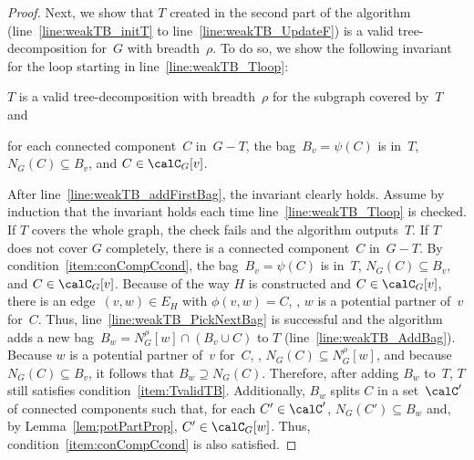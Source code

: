 \begin{proof}
Next, we show that $T$ created in the second part of the algorithm (line~\ref{line:weakTB_initT} to line~\ref{line:weakTB_UpdateF}) is a valid tree-decomposition for~$G$ with breadth~$\rho$.
To do so, we show the following invariant for the loop starting in line~\ref{line:weakTB_Tloop}:
\begin{enumerate*}[(i),mode=unboxed]
    \item
        \label{item:TvalidTB}
        $T$ is a valid tree-decomposition with breadth~$\rho$ for the subgraph covered by~$T$ and
    \item
        \label{item:conCompCcond}
        for each connected component~$C$ in~$G - T$, the bag~$B_v = \psi(C)$ is in~$T$, $N_G(C) \subseteq B_v$, and $C \in \calC_G[v]$.
\end{enumerate*}
After line~\ref{line:weakTB_addFirstBag}, the invariant clearly holds.
Assume by induction that the invariant holds each time line~\ref{line:weakTB_Tloop} is checked.
If $T$ covers the whole graph, the check fails and the algorithm outputs~$T$.
If $T$ does not cover $G$ completely, there is a connected component~$C$ in~$G - T$.
By condition~\ref{item:conCompCcond}, the bag~$B_v = \psi(C)$ is in~$T$, $N_G(C) \subseteq B_v$, and $C \in \calC_G[v]$.
Because of the way $H$ is constructed and $C \in \calC_G[v]$, there is an edge~$(v, w) \in E_H$ with $\phi(v, w) = C$, \ie, $w$ is a potential partner of~$v$ for~$C$.
Thus, line~\ref{line:weakTB_PickNextBag} is successful and the algorithm adds a new bag~$B_w = N_G^\rho[w] \cap (B_v \cup C)$ to $T$ (line~\ref{line:weakTB_AddBag}).
Because $w$ is a potential partner of~$v$ for~$C$, \ie, $N_G(C) \subseteq N_G^\rho[w]$, and because $N_G(C) \subseteq B_v$, it follows that $B_w \supseteq N_G(C)$.
Therefore, after adding $B_w$ to~$T$, $T$ still satisfies condition~\ref{item:TvalidTB}.
Additionally, $B_w$ splits $C$ in a set~$\calC'$ of connected components such that, for each $C' \in \calC'$, $N_G(C') \subseteq B_w$ and, by Lemma~\ref{lem:potPartProp}, $C' \in \calC_G[w]$.
Thus, condition~\ref{item:conCompCcond} is also satisfied.
\end{proof}

